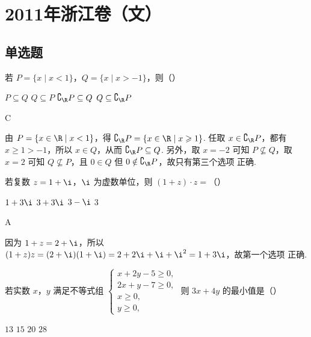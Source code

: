 
\chapter{2011年浙江卷（文）}

\section{单选题}

\begin{problem}
若 \(P = \{x \mid x < 1\}\)，\(Q = \{x \mid x > -1\}\)，则（\quad）

\choices
    {\(P \subseteq Q\)}
    {\(Q \subseteq P\)}
    {\(\complement_{\R} P\subseteq Q\)}
    {\(Q \subseteq \complement_{\R} P\)}
\end{problem}

\begin{answer}
C
\end{answer}

\begin{solution}
由 \(P=\{x\in\R\mid x<1\}\)，得 \(\complement_{\R}P=\{x\in\R\mid x\geqslant 1\}\). 任取 \(x\in\complement_{\R}P\)，都有 \(x\geqslant 1>-1\)，所以 \(x\in Q\)，从而 \(\complement_{\R}P\subseteq Q\). 另外，取 \(x=-2\) 可知 \(P\not\subseteq Q\)，取 \(x=2\) 可知 \(Q\not\subseteq P\)，且 \(0\in Q\) 但 \(0\notin\complement_{\R}P\)，故只有第三个选项 正确.
\end{solution}

\begin{problem}
若复数 \(z = 1 + \i\)，\(\i\) 为虚数单位，则 \((1 + z)\cdot z =\)（\quad）

\choices
    {\(1 + 3\i\)}
    {\(3 + 3\i\)}
    {\(3 - \i\)}
    {\(3\)}
\end{problem}

\begin{answer}
A
\end{answer}

\begin{solution}
因为 \(1+z=2+\i\)，所以 \((1+z)z=(2+\i)(1+\i)=2+2\i+\i+\i^2=1+3\i\)，故第一个选项 正确.
\end{solution}

\begin{problem}
若实数 \(x\)，\(y\) 满足不等式组 \(\begin{cases}
x + 2y - 5 \geqslant 0,\\
2x + y - 7 \geqslant 0,\\
x \geqslant 0,\\
y \geqslant 0,
\end{cases}\) 则 \(3x + 4y\) 的最小值是（\quad）

\choices
    {\(13\)}
    {\(15\)}
    {\(20\)}
    {\(28\)}
\end{problem}

